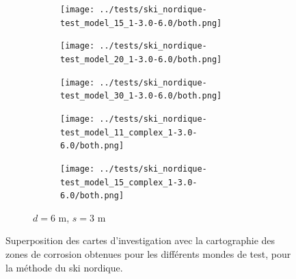 \documentclass[francais,RandD]{rapportPFE}
\begin{document}
\begin{figure}[H]
\begin{subfigure}[t]{\linewidth}
				\hfill
				\begin{subfigure}[t]{0.11\linewidth}
					\texttt{[image: ../tests/ski\_nordique-test\_model\_15\_1-3.0-6.0/both.png]}
				\end{subfigure}
				\hfill
				\begin{subfigure}[t]{0.11\linewidth}
					\texttt{[image: ../tests/ski\_nordique-test\_model\_20\_1-3.0-6.0/both.png]}
				\end{subfigure}
				\hfill
				\begin{subfigure}[t]{0.11\linewidth}
					\texttt{[image: ../tests/ski\_nordique-test\_model\_30\_1-3.0-6.0/both.png]}
				\end{subfigure}
				\hfill
				\begin{subfigure}[t]{0.11\linewidth}
					\texttt{[image: ../tests/ski\_nordique-test\_model\_11\_complex\_1-3.0-6.0/both.png]}
				\end{subfigure}
				\hfill
				\begin{subfigure}[t]{0.11\linewidth}
					\texttt{[image: ../tests/ski\_nordique-test\_model\_15\_complex\_1-3.0-6.0/both.png]}
				\end{subfigure}
				\caption{$d = 6$ m, $s = 3$ m}
			\end{subfigure}
			\caption{Superposition des cartes d'investigation avec la cartographie des zones de corrosion obtenues pour les différents mondes de test, pour la méthode du ski nordique.}
			\label{fig:ski_nordique_resultats_2}
		\end{figure}
\end{document}
